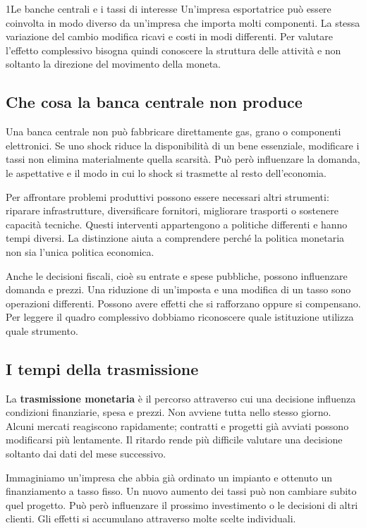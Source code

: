 \begin{lettura}{1}{Le banche centrali e i tassi di interesse}
Un'impresa esportatrice può essere coinvolta in modo diverso da un'impresa che importa molti componenti. La stessa variazione del cambio modifica ricavi e costi in modi differenti. Per valutare l'effetto complessivo bisogna quindi conoscere la struttura delle attività e non soltanto la direzione del movimento della moneta.

\subsection*{Che cosa la banca centrale non produce}
Una banca centrale non può fabbricare direttamente gas, grano o componenti elettronici. Se uno shock riduce la disponibilità di un bene essenziale, modificare i tassi non elimina materialmente quella scarsità. Può però influenzare la domanda, le aspettative e il modo in cui lo shock si trasmette al resto dell'economia.

Per affrontare problemi produttivi possono essere necessari altri strumenti: riparare infrastrutture, diversificare fornitori, migliorare trasporti o sostenere capacità tecniche. Questi interventi appartengono a politiche differenti e hanno tempi diversi. La distinzione aiuta a comprendere perché la politica monetaria non sia l'unica politica economica.

Anche le decisioni fiscali, cioè su entrate e spese pubbliche, possono influenzare domanda e prezzi. Una riduzione di un'imposta e una modifica di un tasso sono operazioni differenti. Possono avere effetti che si rafforzano oppure si compensano. Per leggere il quadro complessivo dobbiamo riconoscere quale istituzione utilizza quale strumento.

\subsection*{I tempi della trasmissione}
La \textbf{trasmissione monetaria} è il percorso attraverso cui una decisione influenza condizioni finanziarie, spesa e prezzi. Non avviene tutta nello stesso giorno. Alcuni mercati reagiscono rapidamente; contratti e progetti già avviati possono modificarsi più lentamente. Il ritardo rende più difficile valutare una decisione soltanto dai dati del mese successivo.

Immaginiamo un'impresa che abbia già ordinato un impianto e ottenuto un finanziamento a tasso fisso. Un nuovo aumento dei tassi può non cambiare subito quel progetto. Può però influenzare il prossimo investimento o le decisioni di altri clienti. Gli effetti si accumulano attraverso molte scelte individuali.


\end{lettura}

